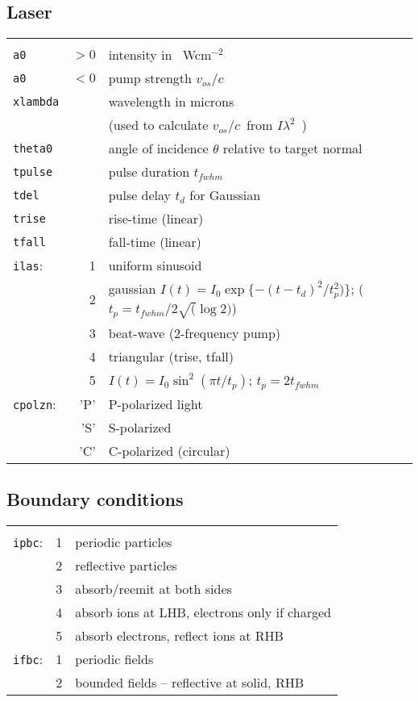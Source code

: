 \documentclass[11pt]{article}
\newcommand{\Ilam}{$I\lambda^{2}$}
\newcommand{\Wcm}{~Wcm$^{-2}$}
\newcommand{\voc}{$v_{os}/c$}
\begin{document}
\subsection{Laser} 
\begin{tabular}{lrl}
\hline \\
\texttt{a0}& $>0$ &intensity in \Wcm\ \\ 
\texttt{a0}& $<0$ &pump strength \voc \\ 
\texttt{xlambda} & & wavelength in microns \\
&& (used to calculate \voc\ from \Ilam\ ) \\
\texttt{theta0} && angle of incidence $\theta$ relative to target normal\\ 
\texttt{tpulse} & & pulse duration $t_{fwhm}$ \\
\texttt{tdel} & & pulse delay $t_d$ for Gaussian \\
\texttt{trise} & & rise-time (linear) \\
\texttt{tfall} & & fall-time (linear) \\
\texttt{ilas}:& 1 & uniform sinusoid \\ 
 & 2 & gaussian $I(t) = I_0\exp \{-(t-t_d)^2/t_p^2)\}$;  ($t_p=t_{fwhm}/2\sqrt(\log2)$) \\ 
 & 3 & beat-wave (2-frequency pump) \\
 & 4 & triangular (trise, tfall) \\ 
 & 5 & $I(t) = I_0\sin^2 (\pi t/t_p)$; $t_p=2 t_{fwhm}$\\
\texttt{cpolzn}:&'P' & P-polarized light \\ 
	 &'S' & S-polarized \\ 
  	 & 'C'& C-polarized (circular)\\
\end{tabular} 




\subsection{Boundary conditions}
\begin{tabular}{lrl} 
\hline \\
\texttt{ipbc}: & 1 & periodic particles \\ 
	       & 2 & reflective particles\\ 
		& 3 & absorb/reemit at both sides\\ 
		& 4 & absorb ions at LHB, electrons only if charged\\ 
		& 5 & absorb electrons, reflect ions at RHB\\
\texttt{ifbc}: & 1 & periodic fields \\ 
		& 2 & bounded fields -- reflective at solid, RHB
\end{tabular}
 
\end{document}
